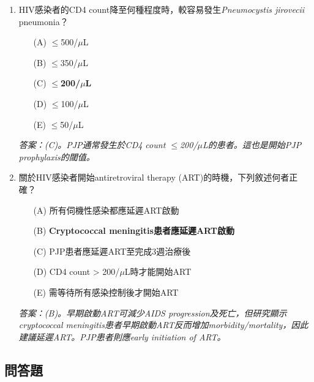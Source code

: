 \documentclass[12pt,a4paper]{article}
\begin{document}
\begin{enumerate}
    \vspace{0.5cm}

    \item HIV感染者的CD4 count降至何種程度時，較容易發生\textit{Pneumocystis jirovecii} pneumonia？
    \begin{enumerate}
        \item[(A)] $\leq$500/$\mu$L
        \item[(B)] $\leq$350/$\mu$L
        \item[(C)] \textbf{$\leq$200/$\mu$L}
        \item[(D)] $\leq$100/$\mu$L
        \item[(E)] $\leq$50/$\mu$L
    \end{enumerate}
    \textit{答案：(C)。PJP通常發生於CD4 count $\leq$200/$\mu$L的患者。這也是開始PJP prophylaxis的閾值。}

    \vspace{0.5cm}

    \item 關於HIV感染者開始antiretroviral therapy (ART)的時機，下列敘述何者正確？
    \begin{enumerate}
        \item[(A)] 所有伺機性感染都應延遲ART啟動
        \item[(B)] \textbf{Cryptococcal meningitis患者應延遲ART啟動}
        \item[(C)] PJP患者應延遲ART至完成3週治療後
        \item[(D)] CD4 count > 200/$\mu$L時才能開始ART
        \item[(E)] 需等待所有感染控制後才開始ART
    \end{enumerate}
    \textit{答案：(B)。早期啟動ART可減少AIDS progression及死亡，但研究顯示cryptococcal meningitis患者早期啟動ART反而增加morbidity/mortality，因此建議延遲ART。PJP患者則應early initiation of ART。}
\end{enumerate}

\subsection{問答題}
\end{document}
